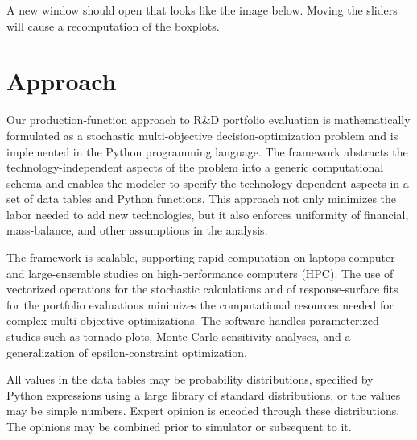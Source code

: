 \documentclass[letterpaper,10pt,english]{sphinxmanual}
\begin{document}
\begin{sphinxVerbatim}[commandchars=\\\{\}]
  
\end{sphinxVerbatim}

A new window should open that looks like the image below. Moving the
sliders will cause a recomputation of the boxplots.

\begin{sphinxVerbatim}[commandchars=\\\{\}]
\end{sphinxVerbatim}

\noindent{}


\chapter{Approach}
\label{\detokenize{approach:approach}}\label{\detokenize{approach:sec-approach}}\label{\detokenize{approach::doc}}
Our production-function approach to R\&D portfolio evaluation is
mathematically formulated as a stochastic multi-objective
decision-optimization problem and is implemented in the Python
programming language. The framework abstracts the technology-independent
aspects of the problem into a generic computational schema and enables
the modeler to specify the technology-dependent aspects in a set of data
tables and Python functions. This approach not only minimizes the labor
needed to add new technologies, but it also enforces uniformity of
financial, mass-balance, and other assumptions in the analysis.

The framework is scalable, supporting rapid computation on laptops
computer and large-ensemble studies on high-performance computers (HPC).
The use of vectorized operations for the stochastic calculations and of
response-surface fits for the portfolio evaluations minimizes the
computational resources needed for complex multi-objective
optimizations. The software handles parameterized studies such as
tornado plots, Monte-Carlo sensitivity analyses, and a generalization of
epsilon-constraint optimization.

All values in the data tables may be probability distributions,
specified by Python expressions using a large library of standard
distributions, or the values may be simple numbers. Expert opinion is
encoded through these distributions. The opinions may be combined prior
to simulator or subsequent to it.
\end{document}
